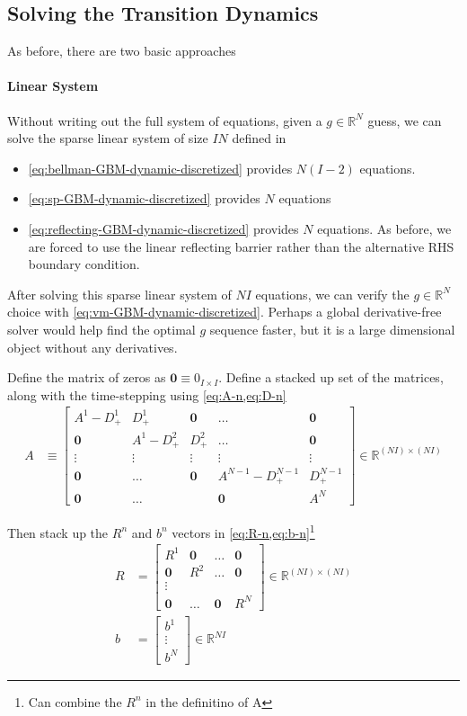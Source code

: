 \documentclass[11pt]{article}
\newcommand{\R}{\ensuremath{\mathbb{R}}}
\begin{document}
\subsection{Solving the Transition Dynamics}\label{eq:solving-transition-dynamics}
As before, there are two basic approaches
\paragraph{Linear System}
Without writing out the full system of equations, given a $g\in\R^N$ guess, we can solve the sparse linear system of size $I N$ defined in
\begin{itemize}
\item \cref{eq:bellman-GBM-dynamic-discretized} provides $N(I-2)$ equations.
\item \cref{eq:sp-GBM-dynamic-discretized} provides $N$ equations
\item \cref{eq:reflecting-GBM-dynamic-discretized} provides $N$ equations.  As before, we are forced to use the linear reflecting barrier rather than the alternative RHS boundary condition.
\end{itemize}
After solving this sparse linear system of $N I$ equations, we can verify the $g\in\R^N$ choice with \cref{eq:vm-GBM-dynamic-discretized}.  Perhaps a global derivative-free solver would help find the optimal $g$ sequence faster, but it is a large dimensional object without any derivatives.

Define the matrix of zeros as $\mathbf{0} \equiv 0_{I\times I}$.  Define a stacked up set of the matrices, along with the time-stepping using \cref{eq:A-n,eq:D-n} \begin{align}
A &\equiv \begin{bmatrix}
A^1 - D_{+}^1	& D_{+}^1		& \mathbf{0}			 & \ldots 			& \mathbf{0}\\
\mathbf{0} 		&A^1 - D_{+}^2 & D_{+}^2 				 & \ldots			 & \mathbf{0}\\	
\vdots 			& \vdots 		& \vdots				& \vdots			&\vdots\\
\mathbf{0} 		&\ldots 	 	&\mathbf{0}				& A^{N-1} - D_{+}^{N-1} & D_{+}^{N-1}\\
\mathbf{0} 		&\ldots 		&						& \mathbf{0}	&A^N
\end{bmatrix}\in\R^{(N I)\times (N I)}
\end{align}

Then stack up the $R^n$ and $b^n$ vectors in \cref{eq:R-n,eq:b-n}\footnote{Can combine the $R^n$ in the definitino of A}
\begin{align}
R &= \begin{bmatrix}
	R^1 & \mathbf{0} & \ldots & \mathbf{0}\\
	\mathbf{0} & R^2 & \ldots &\mathbf{0}\\
	\vdots \\
	\mathbf{0} & \ldots &\mathbf{0}& R^N \end{bmatrix}\in\R^{(N I)\times (N I)}\label{eq:R}\\
b &=\begin{bmatrix}
	b^1 \\
	\vdots \\ b^N \end{bmatrix}\in\R^{N I}\label{eq:b}
\end{align}
		
\end{document}
